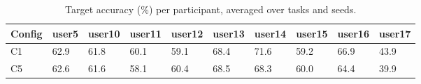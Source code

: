 \begin{table}[t]
\centering
\small
\caption{Target accuracy (\%) per participant, averaged over tasks and seeds.}
\label{tab:T11_per_user_accuracy}
\begin{tabular}{llllllllll}
\hline
Config & user5 & user10 & user11 & user12 & user13 & user14 & user15 & user16 & user17 \\
\hline
C1 & 62.9 & 61.8 & 60.1 & 59.1 & 68.4 & 71.6 & 59.2 & 66.9 & 43.9 \\
C5 & 62.6 & 61.6 & 58.1 & 60.4 & 68.5 & 68.3 & 60.0 & 64.4 & 39.9 \\
\hline
\end{tabular}
\end{table}
